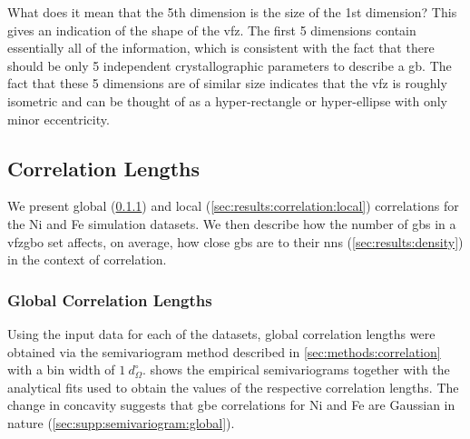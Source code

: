 \documentclass[final,twocolumn,12pt]{elsarticle}
\begin{document}
	What does it mean that the 5th dimension is \percFiveVsOne{} the size of the 1st dimension? This gives an indication of the shape of the \gls{vfz}. The first 5 dimensions contain essentially all of the information, which is consistent with the fact that there should be only 5 independent crystallographic parameters to describe a \gls{gb}. The fact that these 5 dimensions are of similar size indicates that the \gls{vfz} is roughly isometric and can be thought of as a hyper-rectangle or hyper-ellipse with only minor eccentricity. %
	\subsection{Correlation Lengths} \label{sec:results:correlation}
	
	We present global (\cref{sec:results:correlation:global}) and local (\cref{sec:results:correlation:local}) correlations for the Ni and Fe simulation datasets. We then describe how the number of \glspl{gb} in a \gls{vfzgbo} set affects, on average, how close \glspl{gb} are to their \glspl{nn} (\cref{sec:results:density}) in the context of correlation.
	
	\subsubsection{Global Correlation Lengths} \label{sec:results:correlation:global}
	
	Using the input data for each of the datasets, global correlation lengths were obtained via the semivariogram method described in \cref{sec:methods:correlation} with a bin width of ${1\ d_{\Omega}^{\circ}}$.  shows the empirical semivariograms together with the analytical fits used to obtain the values of the respective correlation lengths. The change in concavity suggests that \gls{gbe} correlations for Ni and Fe are Gaussian in nature (\cref{sec:supp:semivariogram:global}).
	
\end{document}
